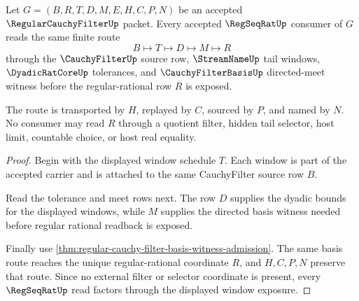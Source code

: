 \begin{theorem}
\label{thm:regular-cauchy-filter-regseqrat-window-exposure}
Let $G=(B,R,T,D,M,E,H,C,P,N)$ be an accepted $\RegularCauchyFilterUp$ packet. Every accepted $\RegSeqRatUp$ consumer of $G$ reads the same finite route
$$
B \longmapsto T \longmapsto D \longmapsto M \longmapsto R
$$
through the $\CauchyFilterUp$ source row, $\StreamNameUp$ tail windows, $\DyadicRatCoreUp$ tolerances, and $\CauchyFilterBasisUp$ directed-meet witness before the regular-rational row $R$ is exposed.

The route is transported by $H$, replayed by $C$, sourced by $P$, and named by $N$. No consumer may read $R$ through a quotient filter, hidden tail selector, host limit, countable choice, or host real equality.
\end{theorem}
\begin{proof}
Begin with the displayed window schedule $T$. Each window is part of the accepted carrier and is attached to the same CauchyFilter source row $B$.

Read the tolerance and meet rows next. The row $D$ supplies the dyadic bounds for the displayed windows, while $M$ supplies the directed basis witness needed before regular rational readback is exposed.

Finally use \autoref{thm:regular-cauchy-filter-basis-witness-admission}. The same basis route reaches the unique regular-rational coordinate $R$, and $H,C,P,N$ preserve that route. Since no external filter or selector coordinate is present, every $\RegSeqRatUp$ read factors through the displayed window exposure.
\end{proof}

